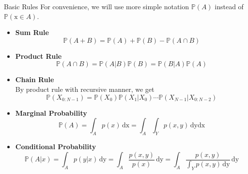 \documentclass{bredelebeamer}
\begin{document}
\begin{frame}{Basic Rules}
  For convenience, we will use more simple notation $\mathbb{P}(A)$ instead of
  $\mathbb{P}(\mathrm{x} \in A)$.
  \begin{itemize}
    \item\textbf{Sum Rule}
    \begin{equation}
      \mathbb{P}(A+B)=\mathbb{P}(A)+\mathbb{P}(B)-\mathbb{P}(A \cap B)
    \end{equation}
    \item\textbf{Product Rule}
    \begin{equation}
      \mathbb{P}(A \cap B)=\mathbb{P}(A|B)\mathbb{P}(B)=\mathbb{P}(B|A)\mathbb{P}(A)
    \end{equation}
    \item\textbf{Chain Rule}\\
    By product rule with recursive manner, we get
    \begin{equation}
      \mathbb{P}(X_{0 : N-1})=\mathbb{P}(X_0)\mathbb{P}(X_1|X_0)\cdots\mathbb{P}(X_{N-1}|X_{0 : N-2})
    \end{equation}
    \item\textbf{Marginal Probability}
    \begin{equation}
      \mathbb{P}(A) = \int_A p(x)\, \mathrm{dx}
      = \int_A \int_Y p(x,y)\, \mathrm{dy}\mathrm{dx}
    \end{equation}
    \item\textbf{Conditional Probability}
    \begin{equation}
      \mathbb{P}(A|x) = \int_A p(y|x)\, \mathrm{dy}
                      = \int_A \frac{p(x, y)}{p(x)}\, \mathrm{dy}
                      = \int_A \frac{p(x, y)}{\int_Y p(x,y)\, \mathrm{dy}}\, \mathrm{dy}
    \end{equation}
  \end{itemize}
\end{frame}
\end{document}
